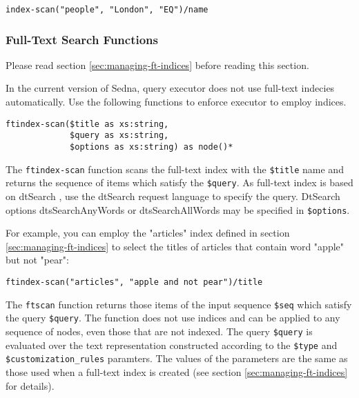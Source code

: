 \documentclass[a4paper,12pt]{article}
\begin{document}
\begin{verbatim}
index-scan("people", "London", "EQ")/name
\end{verbatim}


\subsubsection{Full-Text Search Functions}
\label{sec:ft-fun}

Please read section \ref{sec:managing-ft-indices} before reading this section.

In the current version of Sedna, query executor does not use full-text indecies
automatically. Use the following functions to enforce executor to employ
indices.

\begin{verbatim}
ftindex-scan($title as xs:string,
             $query as xs:string,
             $options as xs:string) as node()*
\end{verbatim}

The \verb!ftindex-scan! function scans the full-text index with the
\verb!$title! name and returns the sequence of items which satisfy the
\verb!$query!. As full-text index is based on dtSearch
\cite{link:dtsearch-engine}, use the dtSearch request language
\cite{doc:dtsearch} to specify the query. DtSearch options dtsSearchAnyWords or
dtsSearchAllWords may be specified in \verb!$options!.

For example, you can employ the "articles" index defined in section
\ref{sec:managing-ft-indices} to select the titles of articles that contain word
"apple" but not "pear":

\begin{verbatim}
ftindex-scan("articles", "apple and not pear")/title
\end{verbatim}

The \verb!ftscan! function returns those items of the input sequence \verb!$seq!
which satisfy the query \verb!$query!. The function does not use indices and can
be applied to any sequence of nodes, even those that are not indexed. The query
\verb!$query! is evaluated over the text representation constructed according to
the \verb!$type! and \verb!$customization_rules! paramters. The values of the
parameters are the same as those used when a full-text index is created (see
section \ref{sec:managing-ft-indices} for details).
\end{document}
